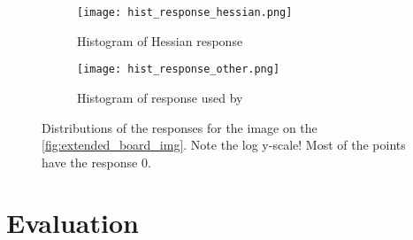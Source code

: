 \begin{figure}
	\centering
	\begin{subfigure}[t]{\linewidth}
		\texttt{[image: hist\_response\_hessian.png]}
		\caption{Histogram of Hessian response}
	\end{subfigure}
	\begin{subfigure}[t]{\linewidth}
		\texttt{[image: hist\_response\_other.png]}
		\caption{Histogram of response used by \cite{geigerAutomaticCameraRange2012}}
	\end{subfigure}
	\caption{Distributions of the responses for the image on the
		\cref{fig:extended_board_img}. Note the log y-scale! Most of the points have
		the response 0.}
\end{figure}

\section{Evaluation}\label{sec:evaluation}



